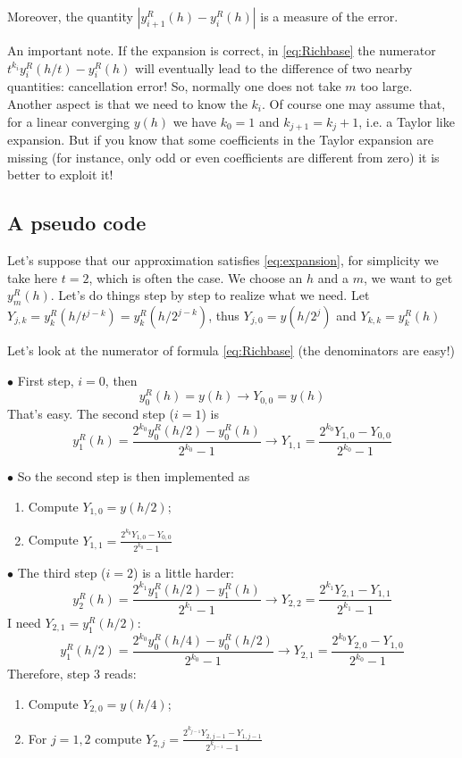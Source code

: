 \documentclass[10pt,a4paper,twoside]{article}
\begin{document}
  Moreover, the quantity $|y^R_{i+1}(h)- y^R_i(h)|$ is a measure of the error.
    
    An important note. If the expansion is correct, in \eqref{eq:Richbase} the numerator $t^{k_i}y^R_i(h/t)-y^R_i(h)$ will eventually lead to the difference of two nearby quantities: cancellation error! So, normally one does not take $m$ too large. Another aspect is that we need to know the $k_i$. Of course one may assume that, for a linear converging $y(h)$ we have $k_0=1$ and 
    $k_{j+1}=k_j+1$, i.e. a Taylor like expansion. 
	But if you know that some coefficients in the Taylor expansion are missing (for instance, only odd or even coefficients are different from zero) 
	it is better to exploit it!
  
  \subsection{A pseudo code}
  Let's suppose that our approximation satisfies \eqref{eq:expansion}, for simplicity we take here $t=2$, which is often the case. We choose an $h$ and a $m$, we want to get $y^R_m(h)$.
  Let's do things step by step to realize what we need. Let $Y_{j,k}=y^R_k(h/t^{j-k})=y^R_k(h/2^{j-k})$, thus $Y_{j,0}=y(h/2^j)$ and $Y_{k,k}=y^R_k(h)$
 
  Let's look at the numerator of formula \eqref{eq:Richbase} (the denominators are easy!)
  
\noindent$\bullet$ First step, $i=0$, then
  \[
  y^R_0(h)=y(h) \rightarrow Y_{0,0}=y(h)
  \]
  That's easy. 
  The second step ($i=1$) is
  \[
  y^R_1(h)=\frac{2^{k_0}y^R_0(h/2)-y^R_0(h)}{2^{k_0}-1} \rightarrow Y_{1,1}=\frac{2^{k_0}Y_{1,0}-Y_{0,0}}{2^{k_0}-1}
  \]
  
\noindent$\bullet$ So the second step is then implemented as
  \begin{enumerate}
      \item Compute $Y_{1,0}=y(h/2)$;
      \item Compute $Y_{1,1}=\frac{2^{k_0}Y_{1,0}-Y_{0,0}}{2^{k_0}-1}$
  \end{enumerate}
  
$\bullet$ The third  step ($i=2$) is a little harder:
 \[
 y^R_2(h)=\frac{2^{k_1}y^R_1(h/2)-y^R_1(h)}{2^{k_1}-1} \rightarrow Y_{2,2}=\frac{2^{k_1}Y_{2,1}-Y_{1,1}}{2^{k_1}-1}
 \]
I need $Y_{2,1}=y^R_1(h/2)$:
\[
y^R_1(h/2)=\frac{2^{k_0}y^R_0(h/4)-y^R_0(h/2)}{2^{k_0}-1}\rightarrow Y_{2,1}=\frac{2^{k_0}Y_{2,0}-Y_{1,0}}{2^{k_0}-1}
\]
Therefore, step 3 reads:
\begin{enumerate}
    \item Compute $Y_{2,0}=y(h/4)$;
    \item For $j=1,2$ compute $Y_{2,j}=\frac{2^{k_{j-1}}Y_{2,j-1}-Y_{1,j-1}}{2^{k_{j-1}}-1}$
\end{enumerate}
 
\end{document}
